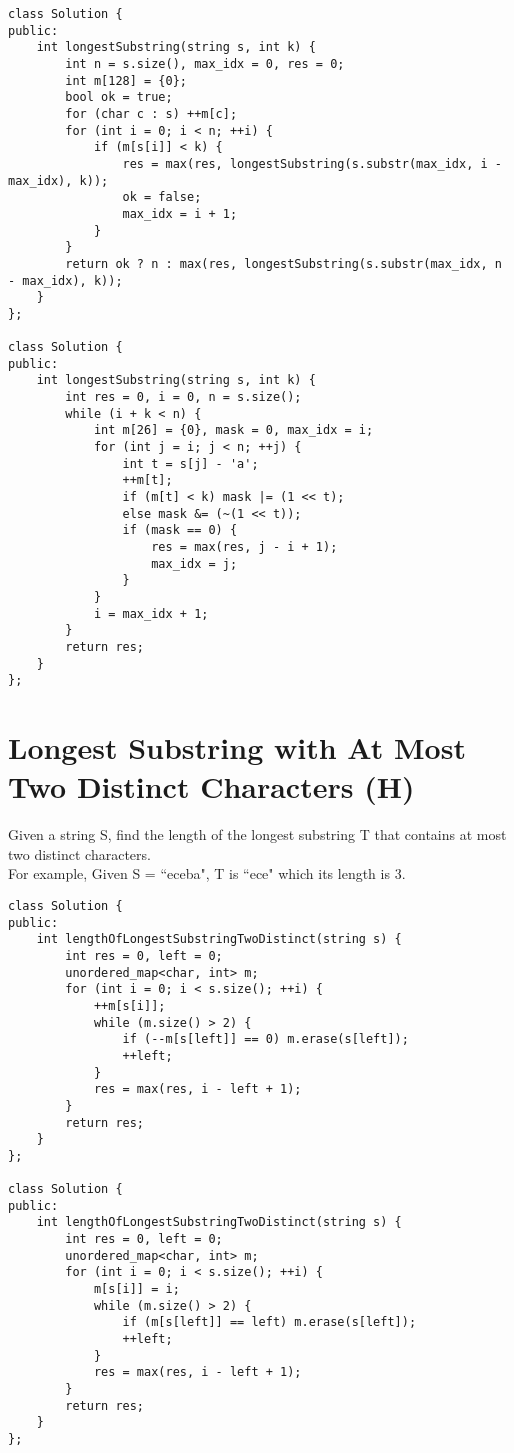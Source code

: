 \begin{lstlisting}
class Solution {
public:
    int longestSubstring(string s, int k) {
        int n = s.size(), max_idx = 0, res = 0;
        int m[128] = {0};
        bool ok = true;
        for (char c : s) ++m[c];
        for (int i = 0; i < n; ++i) {
            if (m[s[i]] < k) {
                res = max(res, longestSubstring(s.substr(max_idx, i - max_idx), k));
                ok = false;
                max_idx = i + 1;
            }
        }
        return ok ? n : max(res, longestSubstring(s.substr(max_idx, n - max_idx), k));
    }
};

class Solution {
public:
    int longestSubstring(string s, int k) {
        int res = 0, i = 0, n = s.size();
        while (i + k < n) {
            int m[26] = {0}, mask = 0, max_idx = i;
            for (int j = i; j < n; ++j) {
                int t = s[j] - 'a';
                ++m[t];
                if (m[t] < k) mask |= (1 << t);
                else mask &= (~(1 << t));
                if (mask == 0) {
                    res = max(res, j - i + 1);
                    max_idx = j;
                }
            }
            i = max_idx + 1;
        }
        return res;
    }
};
\end{lstlisting}


\section{Longest Substring with At Most Two Distinct Characters (H)}
Given a string S, find the length of the longest substring T that contains at most two distinct characters.\\
For example,
Given S = ``eceba",
T is ``ece" which its length is 3. \\

\begin{lstlisting}
class Solution {
public:
    int lengthOfLongestSubstringTwoDistinct(string s) {
        int res = 0, left = 0;
        unordered_map<char, int> m;
        for (int i = 0; i < s.size(); ++i) {
            ++m[s[i]];
            while (m.size() > 2) {
                if (--m[s[left]] == 0) m.erase(s[left]);
                ++left;
            }
            res = max(res, i - left + 1);
        }
        return res;
    }
};

class Solution {
public:
    int lengthOfLongestSubstringTwoDistinct(string s) {
        int res = 0, left = 0;
        unordered_map<char, int> m;
        for (int i = 0; i < s.size(); ++i) {
            m[s[i]] = i;
            while (m.size() > 2) {
                if (m[s[left]] == left) m.erase(s[left]);
                ++left;
            }
            res = max(res, i - left + 1);
        }
        return res;
    }
};
\end{lstlisting}


